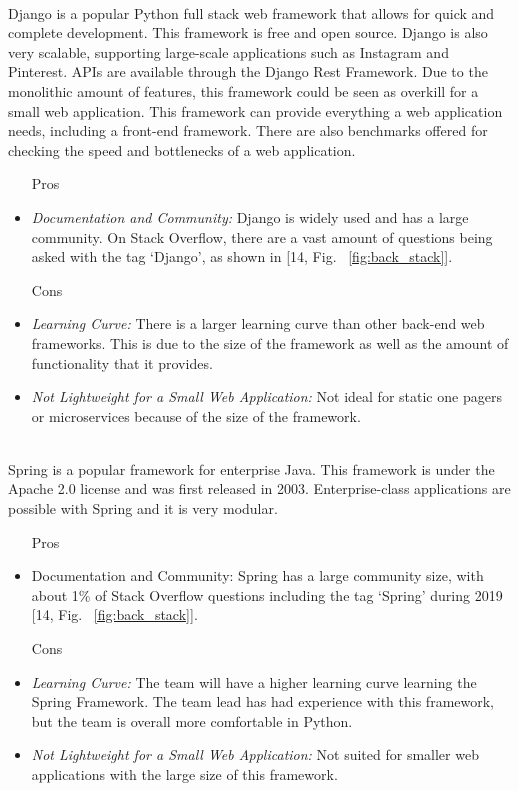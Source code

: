 \documentclass[12pt,journal,compsoc]{IEEEtran}
\newenvironment{subs}
  {\adjustwidth{1em}{0pt}}
  {\endadjustwidth}
\begin{document}
\begin{subs}
\begin{subs}
\begin{subs}
\\
Django is a popular Python full stack web framework that allows for quick and complete development. This framework is free and open source. Django is also very scalable, supporting large-scale applications such as Instagram and Pinterest. APIs are available through the Django Rest Framework. Due to the monolithic amount of features, this framework could be seen as overkill for a small web application. This framework can provide everything a web application needs, including a front-end framework. There are also benchmarks offered for checking the speed and bottlenecks of a web application.

\begin{subs}
\begin{itemize}
    \item [{Pros}]
    \item \emph{Documentation and Community:} Django is widely used and has a large community. On Stack Overflow, there are a vast amount of questions being asked with the tag ‘Django’, as shown in [14, Fig. ~\ref{fig:back_stack}].
    \item [{Cons}]  
    \item \emph{Learning Curve:} There is a larger learning curve than other back-end web frameworks. This is due to the size of the framework as well as the amount of functionality that it provides.
    \item \emph{Not Lightweight for a Small Web Application:} Not ideal for static one pagers or microservices because of the size of the framework.
\end{itemize}
\end{subs}

\\
Spring is a popular framework for enterprise Java. This framework is under the Apache 2.0 license and was first released in 2003. Enterprise-class applications are possible with Spring and it is very modular. 

\begin{subs}
\begin{itemize}
    \item [{Pros}]
    \item Documentation and Community: Spring has a large community size, with about 1\% of Stack Overflow questions including the tag ‘Spring’ during 2019 [14, Fig. ~\ref{fig:back_stack}].
    \item [{Cons}]
    \item \emph{Learning Curve:} The team will have a higher learning curve learning the Spring Framework. The team lead has had experience with this framework, but the team is overall more comfortable in Python.
    \item \emph{Not Lightweight for a Small Web Application:} Not suited for smaller web applications with the large size of this framework.
\end{itemize}
\end{subs}
\end{subs}


\end{subs}
\end{subs}
\end{document}
